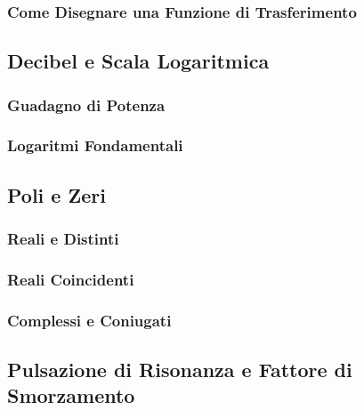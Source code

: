 \documentclass[../main.tex]{subfiles}
\begin{document}
	\subsubsection{Come Disegnare una Funzione di Trasferimento}
	\subsection{Decibel e Scala Logaritmica}
	\subsubsection{Guadagno di Potenza}
	\subsubsection{Logaritmi Fondamentali}
	\subsection{Poli e Zeri}
	\subsubsection{Reali e Distinti}
	\subsubsection{Reali Coincidenti}
	\subsubsection{Complessi e Coniugati}
	\subsection{Pulsazione di Risonanza e Fattore di Smorzamento}
\end{document}
